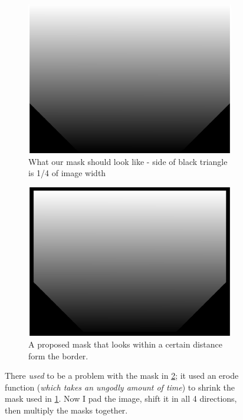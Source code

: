 \documentclass[10pt]{scrartcl}
\begin{document}
\begin{figure}[!ht]
    \centering
    \hspace{-1.0in}
    \begin{subfigure}[b]{.45\linewidth}
        \centering
        \includegraphics[width=1.3\textwidth]{../plots_tables_images/cutcorner.eps}
        \caption{What our mask should look like - side of black triangle is 1/4 of image width}
        \label{noborder}
    \end{subfigure}
    \hspace{.5in}
    \begin{subfigure}[b]{.45\linewidth}
        \centering
        \includegraphics[width=1.3\textwidth]{../plots_tables_images/cutcornerwborder.eps}
        \caption{A proposed mask that looks within a certain distance form the border.}
        \label{aborder}
    \end{subfigure}
    \caption{There \emph{used} to be a problem with the mask in \ref{aborder}; it used an erode function (\emph{which takes an ungodly amount of time}) to shrink the mask used in \ref{noborder}. Now I pad the image, shift it in all 4 directions, then multiply the masks together.}
    \label{cuttingcorners}
\end{figure}
\end{document}
